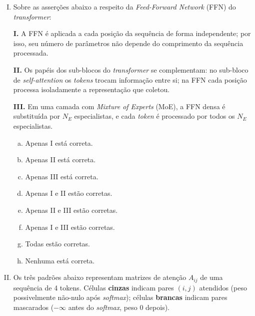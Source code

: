 \documentclass{dlproblemset}
\begin{document}
\begin{enumerate}[I)]
\item Sobre as asserções abaixo a respeito da \textit{Feed-Forward Network} (FFN) do \textit{transformer}:

\textbf{I.} A FFN é aplicada a cada posição da sequência de forma independente; por isso, seu número de parâmetros não depende do comprimento da sequência processada.

\textbf{II.} Os papéis dos sub-blocos do \textit{transformer} se complementam: no sub-bloco de \textit{self-attention} os \textit{tokens} trocam informação entre si; na FFN cada posição processa isoladamente a representação que coletou.

\textbf{III.} Em uma camada com \textit{Mixture of Experts} (MoE), a FFN densa é substituída por $N_E$ especialistas, e cada \textit{token} é processado por todos os $N_E$ especialistas.

\begin{enumerate}[a)]
    \item Apenas I está correta.
    \item Apenas II está correta.
    \item Apenas III está correta.
    \item Apenas I e II estão corretas.
    \item Apenas II e III estão corretas.
    \item Apenas I e III estão corretas.
    \item Todas estão corretas.
    \item Nenhuma está correta.
\end{enumerate}

\item Os três padrões abaixo representam matrizes de atenção $A_{ij}$ de uma sequência de 4 tokens. Células \textbf{cinzas} indicam pares $(i, j)$ atendidos (peso possivelmente não-nulo após \textit{softmax}); células \textbf{brancas} indicam pares mascarados ($-\infty$ antes do \textit{softmax}, peso 0 depois).


\end{enumerate}
\end{document}
